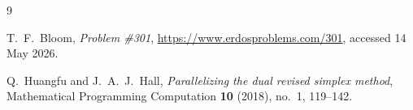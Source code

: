 \documentclass{amsart}
\begin{document}
\begin{thebibliography}{9}

T.~F.~Bloom,
\emph{\Erdos Problem \#301},
\url{https://www.erdosproblems.com/301},
accessed 14 May 2026.

Q.~Huangfu and J.~A.~J.~Hall,
\emph{Parallelizing the dual revised simplex method},
Mathematical Programming Computation \textbf{10} (2018), no.~1, 119--142.

\end{thebibliography}
\end{document}
